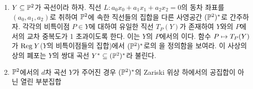 \begin{enumerate}[label=\tb{7.\arabic*.},itemindent=0mm,itemsep=4mm]
	산술종수 $p_a(\Pn)=(-1)^n(1-1)=0$이다.\\
	(b) 평면 $d$차곡선은 단일한 $d$차 동차다항식 $f$에 의해 생성되며
	이러한 $f$는 동차 좌표환 내에서 $d$차 동차다항식들 간의 선형 종속 관계가 된다.
	따라서 $\ph_Y(l)$은 $l\le d$이면 $\binom{l+2}2$,
	$l\ge d$이면 $\binom{l+2}2-\binom{l-d+2}2$이다. ($f$를 인자로 가지는 다항식들 제외)
	그 경우 $P_Y(z)=\binom{z+2}2-\binom{z-d+2}2=\fra 2(z+2)(z+1)-\fra 2(z-d+2)(z-d+1)=zd-\frac{d^2-3d}2$이다.
	따라서 $P_Y(0)=-(d^2-3d)/2$이며 $p_a(Y)=(-1)(P_Y(0)-1)=(d-1)(d-2)/2$이다.\\
	(c) $d$차초곡면도 마찬가지로 단일한 $d$차 동차다항식에 의해 생성되므로 $\ph_Y(l)$은 $l\le d$이면 $\binom{l+n}n$,
	$l\ge d$이면 $\binom{l+n}n-\binom{l-d+n}n$이며 따라서 $P_Y(z)=\binom{z+n}n-\binom{z-d+n}n$이고
	$P_Y(0)=1+(-1)^{n+1}(d-n)\cdots(d-1)/n!$이다. 그러므로 $p_a(Y)=(-1)^{n-1}(P_Y(0)-1)=(d-1)\cdots(d-n)/n!=\binom{d-1}n$이다.\\
	(d) $Y=X_1\cap X_2,X_i=Z(f_i),\deg f_1=a,\deg f_2=b$라 하자. $X_1\cup X_2=Z(f_1f_2)$이므로 $\deg X_1\cup X_2=a+b$이다.
	다음의 완전열에 의해,
	$$0\ra S/(f_1f_2)\ra S/(f_1)\oplus S/(f_2)\ra S/(f_1,f_2)\ra 0$$
	$P_Y=P_{X_1}+P_{X_2}-P_{X_1\cup X_2}=\binom{z+3}3-\binom{z-a+3}3-\binom{z-b+3}3+\binom{z-a-b+3}3$이다.
	그러므로 $p_a(Y)=(-1)^1[\binom{3-a-b}3-\binom{3-a}3-\binom{3-b}3]=\fra 2ab(a+b-4)+1$이다.\\
	(e) $Y$와 $Z$의 동차 좌표환을 각각 $\bigoplus_iM_i\bseq k[x_0,\ldots,x_n]$과
	$\bigoplus N_i\bseq k[y_0,\ldots,y_m]$으로 분해하면
	$X\times Y$의 동차 좌표환은 $\bigoplus_iM_i\otimes N_i$와 동형이다. cf. (Ex. 2.14), (Ex. 7.1b).
	텐서곱의 차원은 곱인자의 차원의 곱이므로 $\ph_{Y\times Z}(l)=\ph_Y(l)\ph_Z(l)$이며 따라서 $\ph_{Y\times Z}=\ph_Y\ph_Z$이다.
	그러므로 $P_{Y\times Z}=P_YP_Z$이며 $p_a(Y\times Z)=(-1)^{r+s}(P_Y(0)P_Z(0)-1)
	=(-1)^{r+s}[(P_Y(0)-1)(P_Z(0)-1)+(P_Y(0)-1)+(P_Z(0)-1)]=p_a(Y)p_a(Z)+(-1)^sp_a(Y)+(-1)^rp_a(Z)$이다.
		\item {} $Y\subseteq\mathbb{P}^2$가 곡선이라 하자.
		직선 $L:a_0x_0+a_1x_1+a_2x_2=0$의 동차 좌표를 $(a_0,a_1,a_2)$로 취하여
		$\mathbb{P}^2$에 속한 직선들의 집합을 다른 사영공간 $(\mathbb{P}^2)^*$로 간주하자.
		각각의 비특이점 $P\in Y$에 대하여 유일한 직선 $T_P(Y)$가 존재하여 $Y$와의 $P$에서의 교차 중복도가 1 초과이도록 한다.
		이는 $Y$의 $P$에서의 이다.
		함수 $P\mapsto T_P(Y)$가 $\mathrm{Reg}\:Y$($Y$의 비특이점들의 집합)에서 $(\mathbb{P}^2)^*$로의 을 정의함을 보여라.
		이 사상의 상의 폐포는 $Y$의 쌍대 곡선 $Y^*\subseteq(\mathbb{P}^2)^*$라 불린다.
		\item $\mathbb{P}^2$에서의 $d$차 곡선 $Y$가 주어진 경우 $(\mathbb{P}^2)^*$의 Zariski 위상 하에서의 공집합이 아닌 열린 부분집합

\end{enumerate}
